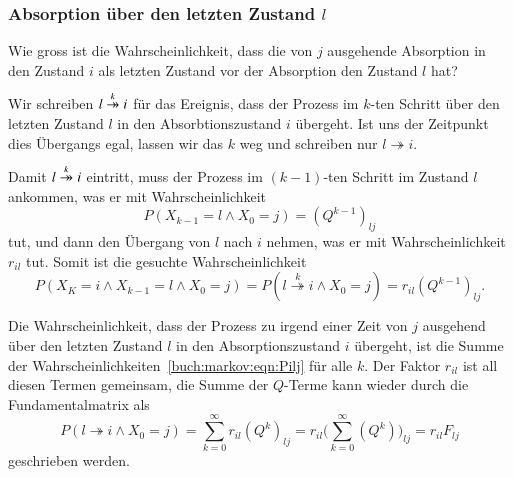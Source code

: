 \subsubsection{Absorption über den letzten Zustand $l$}
\begin{frage}
Wie gross ist die Wahrscheinlichkeit, dass die von $j$ ausgehende
Absorption in den Zustand $i$ als letzten Zustand vor der Absorption
den Zustand $l$ hat?
\end{frage}
Wir schreiben $l\overset{\smash{k}}{\twoheadrightarrow} i$ für das Ereignis, dass der Prozess
im $k$-ten Schritt über den letzten
Zustand $l$ in den Absorbtionszustand $i$ übergeht.
Ist uns der Zeitpunkt dies Übergangs egal, lassen wir das $k$
weg und schreiben nur $l\twoheadrightarrow i$.

Damit $l\overset{\smash{k}}{\twoheadrightarrow} i$ eintritt, muss der Prozess im $(k-1)$-ten Schritt im
Zustand $l$ ankommen, was er mit Wahrscheinlichkeit
\[
P(X_{k-1}=l\wedge X_0=j) = (Q^{k-1})_{l\!j}
\]
tut, und dann den Übergang von $l$ nach $i$ nehmen, was er mit
Wahrscheinlichkeit $r_{il}$ tut.
Somit ist die gesuchte Wahrscheinlichkeit
\begin{equation}
P(X_K=i\wedge X_{k-1}=l\wedge X_0=j)
=
P(l\overset{k}{\twoheadrightarrow} i\wedge X_0=j)
=
r_{il}(Q^{k-1})_{l\!j}.
\label{buch:markov:eqn:Pilj}
\end{equation}

Die Wahrscheinlichkeit, dass der Prozess zu irgend einer Zeit von $j$
ausgehend über den letzten Zustand $l$ in den Absorptionszustand $i$
übergeht, ist die Summe der Wahrscheinlichkeiten~\eqref{buch:markov:eqn:Pilj}
für alle $k$.
Der Faktor $r_{il}$ ist all diesen Termen gemeinsam, die Summe der
$Q$-Terme kann wieder durch die Fundamentalmatrix als
\[
P(l\twoheadrightarrow i\wedge X_0 = j)
=
\sum_{k=0}^\infty r_{il}(Q^k)_{l\!j}
=
r_{il}\biggl(\sum_{k=0}^\infty (Q^k)\biggr)_{l\!j}
=
r_{il}F_{l\!j}
\]
geschrieben werden.

